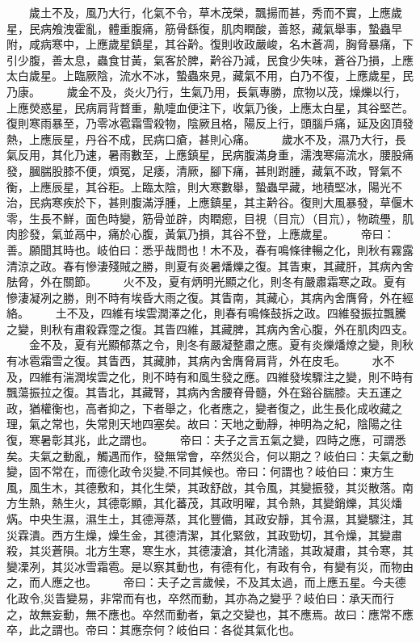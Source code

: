 　　歲土不及，風乃大行，化氣不令，草木茂榮，飄揚而甚，秀而不實，上應歲星，民病飧洩霍亂，體重腹痛，筋骨繇復，肌肉瞤酸，善怒，藏氣舉事，蟄蟲早附，咸病寒中，上應歲星鎮星，其谷黅。復則收政嚴峻，名木蒼凋，胸脅暴痛，下引少腹，善太息，蟲食甘黃，氣客於脾，黅谷乃減，民食少失味，蒼谷乃損，上應太白歲星。上臨厥陰，流水不冰，蟄蟲來見，藏氣不用，白乃不復，上應歲星，民乃康。
　　歲金不及，炎火乃行，生氣乃用，長氣專勝，庶物以茂，燥爍以行，上應熒惑星，民病肩背瞀重，鼽嚏血便注下，收氣乃後，上應太白星，其谷堅芒。復則寒雨暴至，乃零冰雹霜雪殺物，陰厥且格，陽反上行，頭腦戶痛，延及囟頂發熱，上應辰星，丹谷不成，民病口瘡，甚則心痛。
　　歲水不及，濕乃大行，長氣反用，其化乃速，暑雨數至，上應鎮星，民病腹滿身重，濡洩寒瘍流水，腰股痛發，膕腨股膝不便，煩冤，足痿，清厥，腳下痛，甚則跗腫，藏氣不政，腎氣不衡，上應辰星，其谷秬。上臨太陰，則大寒數舉，蟄蟲早藏，地積堅冰，陽光不治，民病寒疾於下，甚則腹滿浮腫，上應鎮星，其主黅谷。復則大風暴發，草偃木零，生長不鮮，面色時變，筋骨並辟，肉瞤瘛，目視（目巟）（目巟），物疏璺，肌肉胗發，氣並鬲中，痛於心腹，黃氣乃損，其谷不登，上應歲星。
　　帝曰：善。願聞其時也。岐伯曰：悉乎哉問也！木不及，春有鳴條律暢之化，則秋有霧露清涼之政。春有慘淒殘賊之勝，則夏有炎暑燔爍之復。其眚東，其藏肝，其病內舍胠脅，外在關節。
　　火不及，夏有炳明光顯之化，則冬有嚴肅霜寒之政。夏有慘淒凝冽之勝，則不時有埃昏大雨之復。其眚南，其藏心，其病內舍膺脅，外在經絡。
　　土不及，四維有埃雲潤澤之化，則春有鳴條鼓拆之政。四維發振拉飄騰之變，則秋有肅殺霖霪之復。其眚四維，其藏脾，其病內舍心腹，外在肌肉四支。
　　金不及，夏有光顯郁蒸之令，則冬有嚴凝整肅之應。夏有炎爍燔燎之變，則秋有冰雹霜雪之復。其眚西，其藏肺，其病內舍膺脅肩背，外在皮毛。
　　水不及，四維有湍潤埃雲之化，則不時有和風生發之應。四維發埃驟注之變，則不時有飄蕩振拉之復。其眚北，其藏腎，其病內舍腰脊骨髓，外在谿谷腨膝。夫五運之政，猶權衡也，高者抑之，下者舉之，化者應之，變者復之，此生長化成收藏之理，氣之常也，失常則天地四塞矣。故曰：天地之動靜，神明為之紀，陰陽之往復，寒暑彰其兆，此之謂也。
　　帝曰：夫子之言五氣之變，四時之應，可謂悉矣。夫氣之動亂，觸遇而作，發無常會，卒然災合，何以期之？岐伯曰：夫氣之動變，固不常在，而德化政令災變,不同其候也。帝曰：何謂也？岐伯曰：東方生風，風生木，其德敷和，其化生榮，其政舒啟，其令風，其變振發，其災散落。南方生熱，熱生火，其德彰顯，其化蕃茂，其政明曜，其令熱，其變銷爍，其災燔焫。中央生濕，濕生土，其德溽蒸，其化豐備，其政安靜，其令濕，其變驟注，其災霖潰。西方生燥，燥生金，其德清潔，其化緊斂，其政勁切，其令燥，其變肅殺，其災蒼隕。北方生寒，寒生水，其德淒滄，其化清謐，其政凝肅，其令寒，其變凓冽，其災冰雪霜雹。是以察其動也，有德有化，有政有令，有變有災，而物由之，而人應之也。
　　帝曰：夫子之言歲候，不及其太過，而上應五星。今夫德化政令,災眚變易，非常而有也，卒然而動，其亦為之變乎？岐伯曰：承天而行之，故無妄動，無不應也。卒然而動者，氣之交變也，其不應焉。故曰：應常不應卒，此之謂也。帝曰：其應奈何？岐伯曰：各從其氣化也。
